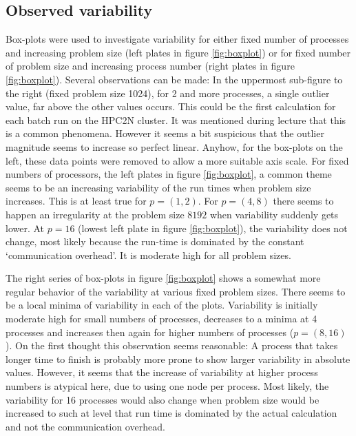 \documentclass[a4paper,11pt,twoside]{article}
\begin{document}
\subsection{Observed variability}
Box-plots were used to investigate variability for either fixed number of processes and increasing problem size (left plates in figure \ref{fig:boxplot}) or for fixed number of problem size and increasing process number (right plates in figure \ref{fig:boxplot}). Several observations can be made: In the uppermost sub-figure to the right (fixed problem size 1024), for 2 and more processes, a single outlier value, far above the other values occurs. This could be the first calculation for each batch run on the HPC2N cluster. It was mentioned during lecture that this is a common phenomena. However it seems a bit suspicious that the outlier magnitude seems to increase so perfect linear. Anyhow, for the box-plots on the left, these data points were removed to allow a more suitable axis scale. For fixed numbers of processors, the left plates in figure \ref{fig:boxplot}, a common theme seems to be an increasing variability of the run times when problem size increases. This is at least true for $p = (1,2)$. For $p = (4, 8)$ there seems to happen an irregularity at the problem size $8192$ when variability suddenly gets lower. At $p = 16$ (lowest left plate in figure \ref{fig:boxplot}), the variability does not change, most likely because the run-time is dominated by the constant `communication overhead'. It is moderate high for all problem sizes. 

The right series of box-plots in figure \ref{fig:boxplot} shows a somewhat more regular behavior of the variability at various fixed problem sizes. There seems to be a local minima of variability in each of the plots. Variability is initially moderate high for small numbers of processes, decreases to a minima at 4 processes and increases then again for higher numbers of processes  ($p = (8, 16)$). On the first thought this observation seems reasonable: A process that takes longer time to finish is probably more prone to show larger variability in absolute values. However, it seems that the increase of variability at higher process numbers is atypical here, due to using one node per process. Most likely, the variability for 16 processes would also change when problem size would be increased to such at level that run time is dominated by the actual calculation and not the communication overhead.
\end{document}
